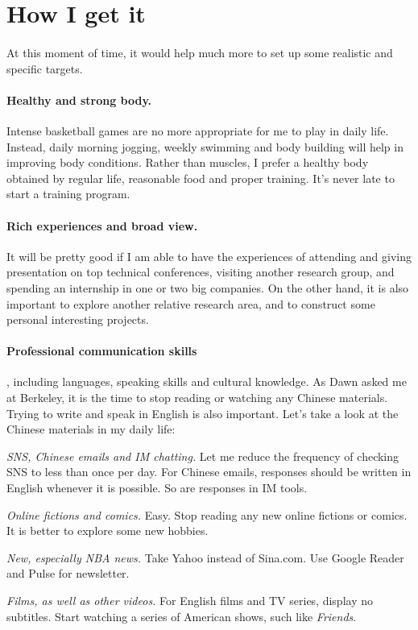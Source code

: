 \section{How I get it}

\paragraph{} At this moment of time, it would help much more to set up some realistic and specific targets.

\paragraph{Healthy and strong body.} Intense basketball games are no more appropriate for me to play in daily life. Instead, daily morning jogging, weekly swimming and body building will help in improving body conditions. Rather than muscles, I prefer a healthy body obtained by regular life, reasonable food and proper training. It's never late to start a training program.

\paragraph{Rich experiences and broad view.} It will be pretty good if I am able to have the experiences of attending and giving presentation on top technical conferences, visiting another research group, and spending an internship in one or two big companies. On the other hand, it is also important to explore another relative research area, and to construct some personal interesting projects.

\paragraph{Professional communication skills}, including languages, speaking skills and cultural knowledge. As Dawn asked me at Berkeley, it is the time to stop reading or watching any Chinese materials. Trying to write and speak in English is also important.
Let's take a look at the Chinese materials in my daily life:
\begin{itemize*}
\item \emph{SNS, Chinese emails and IM chatting. } Let me reduce the frequency of checking SNS to less than once per day. For Chinese emails, responses should be written in English whenever it is possible. So are responses in IM tools.
\item \emph{Online fictions and comics. } Easy. Stop reading any new online fictions or comics. It is better to explore some new hobbies.
\item \emph{New, especially NBA news. } Take Yahoo instead of Sina.com. Use Google Reader and Pulse for newsletter.
\item \emph{Films, as well as other videos. } For English films and TV series, display no subtitles. Start watching a series of American shows, such like \emph{Friends}.
\end{itemize*}

